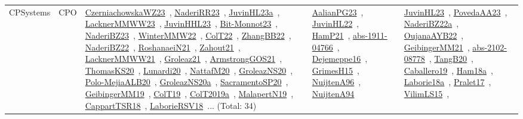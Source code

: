{\begin{longtable}{lp{3cm}>{\raggedright\arraybackslash}p{6cm}>{\raggedright\arraybackslash}p{6cm}>{\raggedright\arraybackslash}p{8cm}}
\index{CPO}\index{CPSystems!CPO}CPSystems & CPO & \href{../works/CzerniachowskaWZ23.pdf}{CzerniachowskaWZ23}~\cite{CzerniachowskaWZ23}, \href{../works/NaderiRR23.pdf}{NaderiRR23}~\cite{NaderiRR23}, \href{../works/JuvinHL23a.pdf}{JuvinHL23a}~\cite{JuvinHL23a}, \href{../works/LacknerMMWW23.pdf}{LacknerMMWW23}~\cite{LacknerMMWW23}, \href{../works/JuvinHHL23.pdf}{JuvinHHL23}~\cite{JuvinHHL23}, \href{../works/Bit-Monnot23.pdf}{Bit-Monnot23}~\cite{Bit-Monnot23}, \href{../works/NaderiBZ23.pdf}{NaderiBZ23}~\cite{NaderiBZ23}, \href{../works/WinterMMW22.pdf}{WinterMMW22}~\cite{WinterMMW22}, \href{../works/ColT22.pdf}{ColT22}~\cite{ColT22}, \href{../works/ZhangBB22.pdf}{ZhangBB22}~\cite{ZhangBB22}, \href{../works/NaderiBZ22.pdf}{NaderiBZ22}~\cite{NaderiBZ22}, \href{../works/RoshanaeiN21.pdf}{RoshanaeiN21}~\cite{RoshanaeiN21}, \href{../works/Zahout21.pdf}{Zahout21}~\cite{Zahout21}, \href{../works/LacknerMMWW21.pdf}{LacknerMMWW21}~\cite{LacknerMMWW21}, \href{../works/Groleaz21.pdf}{Groleaz21}~\cite{Groleaz21}, \href{../works/ArmstrongGOS21.pdf}{ArmstrongGOS21}~\cite{ArmstrongGOS21}, \href{../works/ThomasKS20.pdf}{ThomasKS20}~\cite{ThomasKS20}, \href{../works/Lunardi20.pdf}{Lunardi20}~\cite{Lunardi20}, \href{../works/NattafM20.pdf}{NattafM20}~\cite{NattafM20}, \href{../works/GroleazNS20.pdf}{GroleazNS20}~\cite{GroleazNS20}, \href{../works/Polo-MejiaALB20.pdf}{Polo-MejiaALB20}~\cite{Polo-MejiaALB20}, \href{../works/GroleazNS20a.pdf}{GroleazNS20a}~\cite{GroleazNS20a}, \href{../works/SacramentoSP20.pdf}{SacramentoSP20}~\cite{SacramentoSP20}, \href{../works/GeibingerMM19.pdf}{GeibingerMM19}~\cite{GeibingerMM19}, \href{../works/ColT19.pdf}{ColT19}~\cite{ColT19}, \href{../works/ColT2019a.pdf}{ColT2019a}~\cite{ColT2019a}, \href{../works/MalapertN19.pdf}{MalapertN19}~\cite{MalapertN19}, \href{../works/CappartTSR18.pdf}{CappartTSR18}~\cite{CappartTSR18}, \href{../works/LaborieRSV18.pdf}{LaborieRSV18}~\cite{LaborieRSV18}... (Total: 34) & \href{../works/AalianPG23.pdf}{AalianPG23}~\cite{AalianPG23}, \href{../works/JuvinHL22.pdf}{JuvinHL22}~\cite{JuvinHL22}, \href{../works/HamP21.pdf}{HamP21}~\cite{HamP21}, \href{../works/abs-1911-04766.pdf}{abs-1911-04766}~\cite{abs-1911-04766}, \href{../works/Dejemeppe16.pdf}{Dejemeppe16}~\cite{Dejemeppe16}, \href{../works/GrimesH15.pdf}{GrimesH15}~\cite{GrimesH15}, \href{../works/NuijtenA96.pdf}{NuijtenA96}~\cite{NuijtenA96}, \href{../works/NuijtenA94.pdf}{NuijtenA94}~\cite{NuijtenA94} & \href{../works/JuvinHL23.pdf}{JuvinHL23}~\cite{JuvinHL23}, \href{../works/PovedaAA23.pdf}{PovedaAA23}~\cite{PovedaAA23}, \href{../works/NaderiBZ22a.pdf}{NaderiBZ22a}~\cite{NaderiBZ22a}, \href{../works/OujanaAYB22.pdf}{OujanaAYB22}~\cite{OujanaAYB22}, \href{../works/GeibingerMM21.pdf}{GeibingerMM21}~\cite{GeibingerMM21}, \href{../works/abs-2102-08778.pdf}{abs-2102-08778}~\cite{abs-2102-08778}, \href{../works/TangB20.pdf}{TangB20}~\cite{TangB20}, \href{../works/Caballero19.pdf}{Caballero19}~\cite{Caballero19}, \href{../works/Ham18a.pdf}{Ham18a}~\cite{Ham18a}, \href{../works/Laborie18a.pdf}{Laborie18a}~\cite{Laborie18a}, \href{../works/Pralet17.pdf}{Pralet17}~\cite{Pralet17}, \href{../works/VilimLS15.pdf}{VilimLS15}~\cite{VilimLS15}, 
\end{longtable}}
